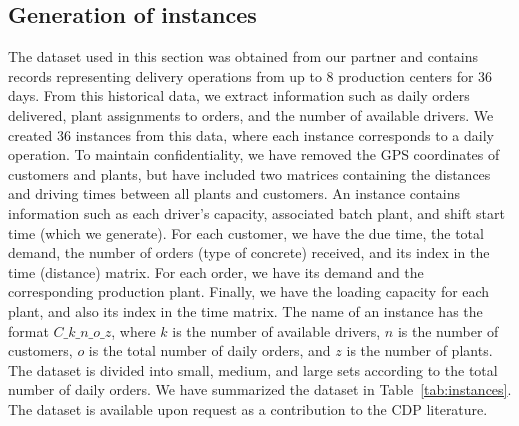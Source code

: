 \documentclass{article}
\begin{document}
\subsection{Generation of instances}
\newcommand{\nbInstance}{36}
The dataset used in this section was obtained from our partner and contains records representing delivery operations from up to 8 production centers for $\nbInstance$ days. From this historical data, we extract information such as daily orders delivered, plant assignments to orders, and the number of available drivers. We created $\nbInstance$ instances from this data, where each instance corresponds to a daily operation. To maintain confidentiality, we have removed the GPS coordinates of customers and plants, but have included two matrices containing the distances and driving times between all plants and customers. An instance contains information such as each driver's capacity, associated batch plant, and shift start time (which we generate). For each customer, we have the due time, the total demand, the number of orders (type of concrete) received, and its index in the time (distance) matrix. For each order, we have its demand and the corresponding production plant. Finally, we have the loading capacity for each plant, and also its index in the time matrix. The name of an instance has the format $C\_k\_n\_o\_z$, where $k$ is the number of available drivers, $n$ is the number of customers, $o$ is the total number of daily orders, and $z$ is the number of plants. The dataset is divided into small, medium, and large sets according to the total number of daily orders. We have summarized the dataset in Table~\ref{tab:instances}. The dataset is available upon request as a contribution to the CDP literature.

\begin{table}[htpb]
    \centering
    \caption{Instances summary}
    \label{tab:instances}
    \small
\end{table}
\end{document}
